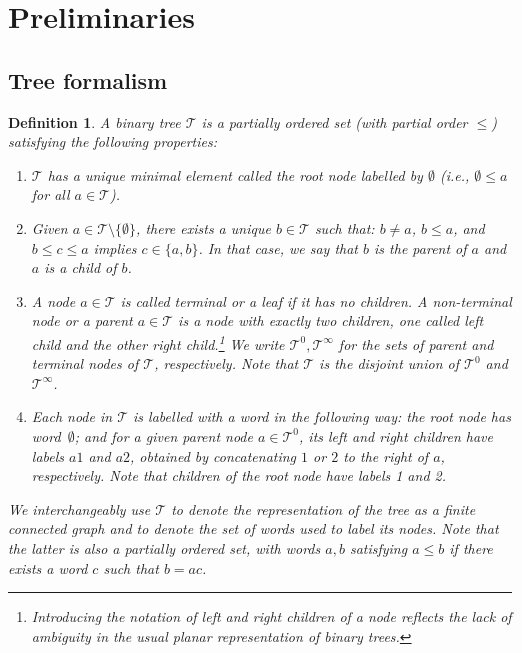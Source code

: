 \documentclass[a4paper,
11pt,  reqno]{amsart}
\newcommand{\5}{\textup{V}}
\newcommand{\noi}{\noindent}
\newtheorem{definition}[theorem]{Definition}
\theoremstyle{remark}
\newcommand{\TT}{\mathcal{T}}
\numberwithin{equation}{section}
\numberwithin{theorem}{section}
\begin{document}
\section{Preliminaries}\label{sec:prem}


\subsection{Tree formalism}	
\label{SUB:tree}





\begin{definition}
\label{DEF:tree}
\rm 
A \emph{binary tree} $\TT$ is a partially ordered set (with partial order $\le$) satisfying the following properties:

\begin{enumerate}
\item[(i)] $\TT$ has a unique minimal element called the \textit{root node} labelled by $\emptyset$ (i.e., $\emptyset \le a$ for all $a \in \TT$). 

\smallskip 
\item[(ii)] Given $a\in \TT\setminus \{ \emptyset \}$, 
there exists a unique $b \in \TT$ such that: $b\ne a$, $b \le a$, and $b \le c \le a$ implies $c\in\{a,b\}$. In that case, we say that $b$ is the \textit{parent} of $a$ and $a$ is a \textit{child} of $b$. 

\smallskip 
\item[(iii)] A node $a\in \TT$ is called \textit{terminal} or a \textit{leaf} if it has no children. A \textit{non-terminal node} or a \textit{parent} $a\in\TT$ is a node with exactly two children, one called \textit{left child} and the other \textit{right child}.\footnote{Introducing the notation of left and right children of a node  reflects the lack of ambiguity in the usual planar representation of binary trees.}  
We write $\TT^0, \TT^\infty$ for the sets of parent and terminal nodes of $\TT$, respectively.  Note that $\TT$ is the disjoint union of $\TT^0$ and $\TT^\infty$. 

\smallskip 
\item[(iv)]
Each node in $\TT$ is labelled with a word in the following way: the root node has word~$\emptyset$; and for a given parent node $a\in \TT^0$, its left and right children have labels $a1$ and $a2$,  obtained by concatenating $1$ or $2$ to the right of $a$, respectively. Note that children of the root node have labels 1 and 2. 


\end{enumerate}



\noi
We interchangeably use $\TT$ to denote the representation of the tree as a finite connected graph and to denote the set of words used to label its nodes. Note that the latter is also a partially ordered set, with words $a,b$ satisfying $a\le b$ if there exists a word $c$ such that $b = ac$. 



\end{definition}
\end{document}
